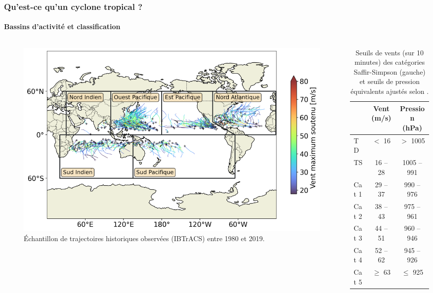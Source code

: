 \documentclass[aspectratio=169, usepdftitle=false, xcolor={dvipsnames}, 9pt,table]{beamer}
\begin{document}
\begin{frame}[c]
    \frametitle{Qu'est-ce qu'un cyclone tropical ?}
    \framesubtitle{Bassins d'activité et classification}
    \begin{columns}
        \begin{column}{0.65\textwidth}
            \begin{figure}[h]
                \centering
                \includegraphics[width=\textwidth]{Figures/Bassins_et_trajectoires_soutenance.png}
                \caption{Échantillon de trajectoires historiques observées (IBTrACS) entre 1980 et 2019.}
            \end{figure}
        \end{column}
        \begin{column}{0.35\textwidth}
            \begin{table}[h]
                \centering
                \caption{Seuils de vents (sur 10 minutes) des catégories Saffir-Simpson (gauche) et seuils de pression équivalents ajustés
                selon \cite{klotzbach_surface_2020}.}
                \footnotesize
                \begin{tabular}{l|c|c}
                     & Vent (m/s) & Pression (hPa) \\
                    \hline
                    TD & $<$ 16 & $>$ 1005 \\
                    TS & 16 -- 28 & 1005 -- 991 \\
                    Cat 1 & 29 -- 37 & 990 -- 976 \\
                    Cat 2 & 38 -- 43 & 975 -- 961 \\
                    Cat 3 & 44 -- 51 & 960 -- 946 \\
                    Cat 4 & 52 --  62 & 945 -- 926\\
                    Cat 5 & $\geq$ 63 & $\leq$ 925
                \end{tabular}
            \end{table}
        \end{column}
    \end{columns}
\end{frame}
\end{document}
